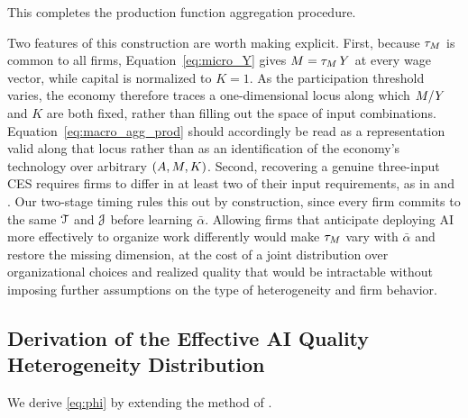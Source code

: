 This completes the production function aggregation procedure.


Two features of this construction are worth making explicit.
First, because $\tau_{M}$ is common to all firms, Equation~\eqref{eq:micro_Y} gives $M = \tau_{M}\,Y$ at every wage vector, while capital is normalized to $K=1$.
As the participation threshold varies, the economy therefore traces a one-dimensional locus along which $M/Y$ and $K$ are both fixed, rather than filling out the space of input combinations.
Equation~\eqref{eq:macro_agg_prod} should accordingly be read as a representation valid along that locus rather than as an identification of the economy's technology over arbitrary $(A, M, K)$.
Second, recovering a genuine three-input CES requires firms to differ in at least two of their input requirements, as in \citet{houthakker1955pareto} and \citet{levhari1968note}.
Our two-stage timing rules this out by construction, since every firm commits to the same $\mathcal{T}$ and $\mathcal{J}$ before learning $\bar{\alpha}$.
Allowing firms that anticipate deploying AI more effectively to organize work differently would make $\tau_{M}$ vary with $\bar{\alpha}$ and restore the missing dimension, at the cost of a joint distribution over organizational choices and realized quality that would be intractable without imposing further assumptions on the type of heterogeneity and firm behavior.





\subsection{Derivation of the Effective AI Quality Heterogeneity Distribution}
\label{sec:aggregationDist}

We derive \eqref{eq:phi} by extending the method of \cite{levhari1968note}.

